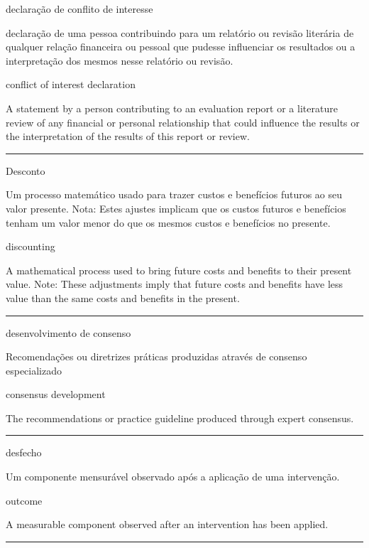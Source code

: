\documentclass[
]{book}
\begin{document}
declaração de conflito de interesse

declaração de uma pessoa contribuindo para um relatório ou revisão literária de qualquer relação financeira ou pessoal que pudesse influenciar os resultados ou a interpretação dos mesmos nesse relatório ou revisão.

conflict of interest declaration

A statement by a person contributing to an evaluation report or a literature review of any financial or personal relationship that could influence the results or the interpretation of the results of this report or review.

\begin{center}\rule{0.5\linewidth}{0.5pt}\end{center}

Desconto

Um processo matemático usado para trazer custos e benefícios futuros ao seu valor presente. Nota: Estes ajustes implicam que os custos futuros e benefícios tenham um valor menor do que os mesmos custos e benefícios no presente.

discounting

A mathematical process used to bring future costs and benefits to their present value. Note: These adjustments imply that future costs and benefits have less value than the same costs and benefits in the present.

\begin{center}\rule{0.5\linewidth}{0.5pt}\end{center}

desenvolvimento de consenso

Recomendações ou diretrizes práticas produzidas através de consenso especializado

consensus development

The recommendations or practice guideline produced through expert consensus.

\begin{center}\rule{0.5\linewidth}{0.5pt}\end{center}

desfecho

Um componente mensurável observado após a aplicação de uma intervenção.

outcome

A measurable component observed after an intervention has been applied.

\begin{center}\rule{0.5\linewidth}{0.5pt}\end{center}
\end{document}
